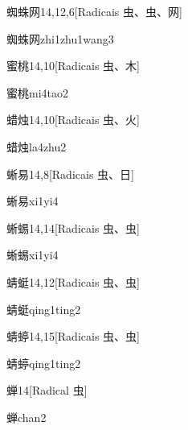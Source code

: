 \begin{entry}{蜘蛛网}{14,12,6}[Radicais ⾍、⾍、⽹]
  \begin{phonetics}{蜘蛛网}{zhi1zhu1wang3}
  \end{phonetics}
\end{entry}

\begin{entry}{蜜桃}{14,10}[Radicais ⾍、⽊]
  \begin{phonetics}{蜜桃}{mi4tao2}
  \end{phonetics}
\end{entry}

\begin{entry}{蜡烛}{14,10}[Radicais ⾍、⽕]
  \begin{phonetics}{蜡烛}{la4zhu2}
  \end{phonetics}
\end{entry}

\begin{entry}{蜥易}{14,8}[Radicais ⾍、⽇]
  \begin{phonetics}{蜥易}{xi1yi4}
  \end{phonetics}
\end{entry}

\begin{entry}{蜥蜴}{14,14}[Radicais ⾍、⾍]
  \begin{phonetics}{蜥蜴}{xi1yi4}
  \end{phonetics}
\end{entry}

\begin{entry}{蜻蜓}{14,12}[Radicais ⾍、⾍]
  \begin{phonetics}{蜻蜓}{qing1ting2}
  \end{phonetics}
\end{entry}

\begin{entry}{蜻蝏}{14,15}[Radicais ⾍、⾍]
  \begin{phonetics}{蜻蝏}{qing1ting2}
  \end{phonetics}
\end{entry}

\begin{entry}{蝉}{14}[Radical ⾍]
  \begin{phonetics}{蝉}{chan2}
  \end{phonetics}
\end{entry}

